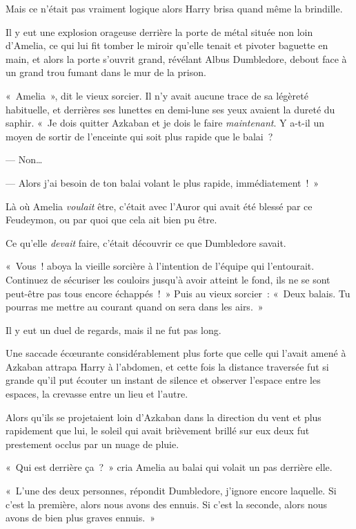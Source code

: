 Mais ce n'était pas vraiment logique alors Harry brisa quand même la brindille.

\later

Il y eut une explosion orageuse derrière la porte de métal située non loin d'Amelia, ce qui lui fit tomber le miroir qu'elle tenait et pivoter baguette en main, et alors la porte s'ouvrit grand, révélant Albus Dumbledore, debout face à un grand trou fumant dans le mur de la prison.

«~Amelia~», dit le vieux sorcier.
Il n'y avait aucune trace de sa légèreté habituelle, et derrières ses lunettes en demi-lune ses yeux avaient la dureté du saphir.
«~Je dois quitter Azkaban et je dois le faire \emph{maintenant}.
Y a-t-il un moyen de sortir de l'enceinte qui soit plus rapide que le balai~?

--- Non…

--- Alors j'ai besoin de ton balai volant le plus rapide, immédiatement~!~»

Là où Amelia \emph{voulait} être, c'était avec l'Auror qui avait été blessé par ce Feudeymon, ou par quoi que cela ait bien pu être.

Ce qu'elle \emph{devait} faire, c'était découvrir ce que Dumbledore savait.

«~Vous~! aboya la vieille sorcière à l'intention de l'équipe qui l'entourait.
Continuez de sécuriser les couloirs jusqu'à avoir atteint le fond, ils ne se sont peut-être pas tous encore échappés~!~»
Puis au vieux sorcier~: «~Deux balais.
Tu pourras me mettre au courant quand on sera dans les airs.~»

Il y eut un duel de regards, mais il ne fut pas long.

\later

Une saccade écœurante considérablement plus forte que celle qui l'avait amené à Azkaban attrapa Harry à l'abdomen, et cette fois la distance traversée fut si grande qu'il put écouter un instant de silence et observer l'espace entre les espaces, la crevasse entre un lieu et l'autre.

\later

Alors qu'ils se projetaient loin d'Azkaban dans la direction du vent et plus rapidement que lui, le soleil qui avait brièvement brillé sur eux deux fut prestement occlus par un nuage de pluie.

«~Qui est derrière ça~?~»
cria Amelia au balai qui volait un pas derrière elle.

«~L'une des deux personnes, répondit Dumbledore, j'ignore encore laquelle.
Si c'est la première, alors nous avons des ennuis.
Si c'est la seconde, alors nous avons de bien plus graves ennuis.~»

